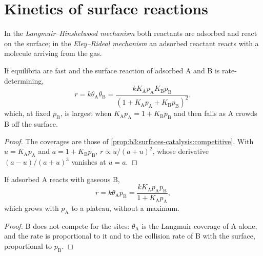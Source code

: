 \section{Kinetics of surface reactions}

\begin{definition}\label{def:b3:surfaces-catalysis:mechanisms}
In the \emph{Langmuir--Hinshelwood mechanism} both reactants are adsorbed and react on the surface; in the
\emph{Eley--Rideal mechanism} an adsorbed reactant
reacts with a molecule arriving from the gas.
\end{definition}

\begin{proposition}\label{prop:b3:surfaces-catalysis:lh-rate}
If  equilibria are fast and the surface reaction of adsorbed A and B
is rate-determining,
\[
  r = k\theta_{\mathrm A}\theta_{\mathrm B} = \frac{kK_{\mathrm A}p_{\mathrm A}K_{\mathrm B}p_{\mathrm B}}{(1 + K_{\mathrm A}p_{\mathrm A} + K_{\mathrm B}p_{\mathrm B})^2},
\]
which, at fixed $p_{\mathrm B}$, is largest when $K_{\mathrm A}p_{\mathrm A} = 1 + K_{\mathrm B}p_{\mathrm B}$ and then falls as A crowds B off the
surface.
\end{proposition}

\begin{proof}
The coverages are those of \cref{prop:b3:surfaces-catalysis:competitive}. With $u =
K_{\mathrm A}p_{\mathrm A}$ and $a = 1 + K_{\mathrm B}p_{\mathrm B}$, $r \propto u/(a + u)^2$, whose derivative $(a - u)/(a + u)^3$ vanishes at
$u = a$.
\end{proof}

\begin{proposition}\label{prop:b3:surfaces-catalysis:er-rate}
If adsorbed A reacts with gaseous B,
\[
  r = k\theta_{\mathrm A}p_{\mathrm B} = \frac{kK_{\mathrm A}p_{\mathrm A}p_{\mathrm B}}{1 + K_{\mathrm A}p_{\mathrm A}},
\]
which grows with $p_{\mathrm A}$ to a plateau, without a maximum.
\end{proposition}

\begin{proof}
B does not compete for the sites: $\theta_{\mathrm A}$ is the Langmuir coverage of A alone, and the
rate is proportional to it and to the collision rate of B with the surface,
proportional to $p_{\mathrm B}$.
\end{proof}

